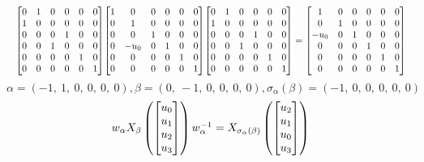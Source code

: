 \documentclass[11pt]{article}
\theoremstyle{definition}
\begin{document}
\[
\scaletoalign{\textwidth}{{\left[\begin{matrix}0 & 1 & 0 & 0 & 0 & 0\\1 & 0 & 0 & 0 & 0 & 0\\0 & 0 & 0 & 1 & 0 & 0\\0 & 0 & 1 & 0 & 0 & 0\\0 & 0 & 0 & 0 & 1 & 0\\0 & 0 & 0 & 0 & 0 & 1\end{matrix}\right]} {\left[\begin{matrix}1 & 0 & 0 & 0 & 0 & 0\\0 & 1 & 0 & 0 & 0 & 0\\0 & 0 & 1 & 0 & 0 & 0\\0 & - u_{0} & 0 & 1 & 0 & 0\\0 & 0 & 0 & 0 & 1 & 0\\0 & 0 & 0 & 0 & 0 & 1\end{matrix}\right]} {\left[\begin{matrix}0 & 1 & 0 & 0 & 0 & 0\\1 & 0 & 0 & 0 & 0 & 0\\0 & 0 & 0 & 1 & 0 & 0\\0 & 0 & 1 & 0 & 0 & 0\\0 & 0 & 0 & 0 & 1 & 0\\0 & 0 & 0 & 0 & 0 & 1\end{matrix}\right]} = {\left[\begin{matrix}1 & 0 & 0 & 0 & 0 & 0\\0 & 1 & 0 & 0 & 0 & 0\\- u_{0} & 0 & 1 & 0 & 0 & 0\\0 & 0 & 0 & 1 & 0 & 0\\0 & 0 & 0 & 0 & 1 & 0\\0 & 0 & 0 & 0 & 0 & 1\end{matrix}\right]}}
\]
\[
\alpha = \left( -1, \  1, \  0, \  0, \  0, \  0\right), \beta = \left( 0, \  -1, \  0, \  0, \  0, \  0\right), \sigma_{\alpha}(\beta) = \left( -1, \  0, \  0, \  0, \  0, \  0\right)
\]
\[
\scaletoalign{\textwidth}{w_{\alpha} X_{\beta}\left(\left[\begin{matrix}u_{0}\\u_{1}\\u_{2}\\u_{3}\end{matrix}\right]\right) w_{\alpha}^{-1} = X_{\sigma_{\alpha}\left(\beta\right)}\left(\left[\begin{matrix}u_{2}\\u_{1}\\u_{0}\\u_{3}\end{matrix}\right]\right)}
\]
\end{document}
